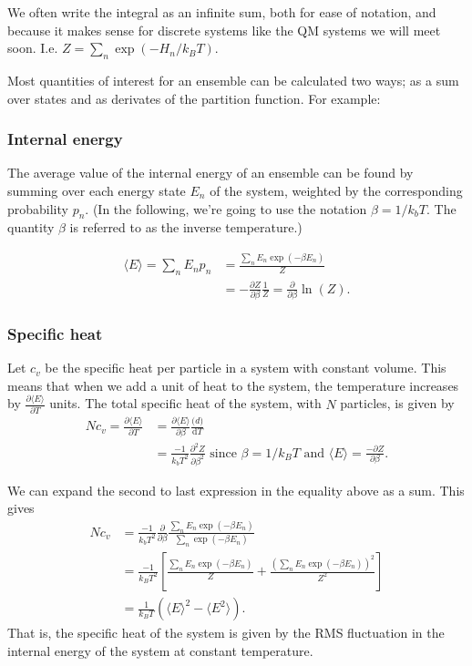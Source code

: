 We often write the integral as an infinite sum, both for ease of notation, and because it makes sense for discrete systems like the QM systems we will meet soon. I.e. $Z=\sum_n\exp(-H_n/k_BT)$.

Most quantities of interest for an ensemble can be calculated two ways; as a sum over states and as derivates of the partition function. For example:

\subsubsection{Internal energy}
The average value of the internal energy of an ensemble can be found by summing over each energy state $E_n$ of the system, weighted by the corresponding probability $p_n$. (In the following, we're going to use the notation $\beta =1/k_bT$. The quantity $\beta$ is referred to as the inverse temperature.)

\begin{align*}
	\langle E \rangle = \sum_n E_n p_n &= \frac{\sum_n E_n\exp(-\beta E_n)}{Z}\\
	&= -\frac{\partial Z}{\partial \beta}\frac{1}{Z} = \frac{\partial}{\partial \beta} \ln(Z).
\end{align*}

\subsubsection{Specific heat}
Let $c_v$ be the specific heat per particle in a system with constant volume. This means that when we add a unit of heat to the system, the temperature increases by $\frac{\partial\langle E\rangle}{\partial T}$ units. The total specific heat of the system, with $N$ particles, is given by
\begin{align*}
	Nc_v = \frac{\partial \langle E \rangle}{\partial T} &=  \frac{\partial \langle E \rangle}{\partial \beta} \frac{\mathrm(d)}{\mathrm{d}T}\\
	&=\frac{-1}{k_bT^2} \frac{\partial^2 Z}{\partial \beta^2} \mbox{ since } \beta = 1/k_BT \mbox{ and } \langle E \rangle = \frac{-\partial Z}{\partial \beta}.
\end{align*}

We can expand the second to last expression in the equality above as a sum. This gives
\begin{align*}
	Nc_v &= \frac{-1}{k_bT^2} \frac{\partial}{\partial \beta} \frac{\sum_n E_n \exp(-\beta E_n)}{\sum_n\exp(-\beta E_n)}\\
	&= \frac{-1}{k_BT^2}\left[\frac{\sum_n E_n\exp(-\beta E_n)}{Z}+ \frac{(\sum_n E_n\exp(-\beta E_n))^2}{Z^2}\right]\\
	&= \frac{1}{k_BT}(\langle E \rangle^2 - \langle E^2\rangle).
\end{align*}
That is, the specific heat of the system is given by the RMS fluctuation in the internal energy of the system at constant temperature.

